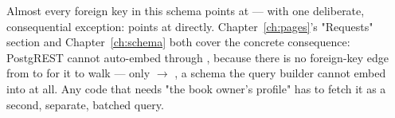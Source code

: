 \begin{olkwarn}
Almost every foreign key in this schema points at  — with one deliberate, consequential exception:  points at  directly. Chapter~\ref{ch:pages}'s "Requests" section and Chapter~\ref{ch:schema} both cover the concrete consequence: PostgREST cannot auto-embed  through , because there is no foreign-key edge from  to  for it to walk — only  $\to$ , a schema the query builder cannot embed into at all. Any code that needs "the book owner's profile" has to fetch it as a second, separate, batched query.
\end{olkwarn}

